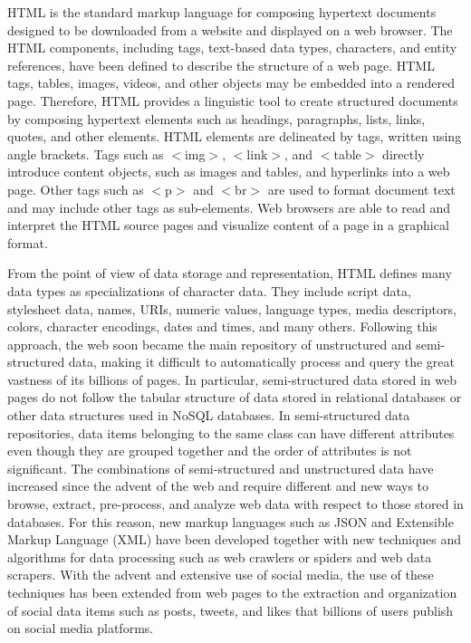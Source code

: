 HTML is the standard markup language for composing hypertext documents designed to be downloaded from a website and displayed on a web browser. The HTML components, including tags, text-based data types, characters, and entity references, have been defined to describe the structure of a web page. HTML tags, tables, images, videos, and other objects may be embedded into a rendered page. Therefore, HTML provides a linguistic tool to create structured documents by composing hypertext elements such as headings, paragraphs, lists, links, quotes, and other elements. HTML elements are delineated by tags, written using angle brackets. Tags such as $<$img$>$, $<$link$>$, and $<$table$>$ directly introduce content objects, such as images and tables, and hyperlinks into a web page. Other tags such as $<$p$>$ and $<$br$>$ are used to format document text and may include other tags as sub-elements. Web browsers are able to read and interpret the HTML source pages and visualize content of a page in a graphical format.

From the point of view of data storage and representation, HTML defines many data types as specializations of character data. They include script data, stylesheet data, names, URIs, numeric values, language types, media descriptors, colors, character encodings, dates and times, and many others. Following this approach, the web soon became the main repository of unstructured and semi-structured data, making it difficult to automatically process and query the great vastness of its billions of pages. In particular, semi-structured data stored in web pages do not follow the tabular structure of data stored in relational databases or other data structures used in NoSQL databases. In semi-structured data repositories, data items belonging to the same class can have different attributes even though they are grouped together and the order of attributes is not significant. The combinations of semi-structured and unstructured data have increased since the advent of the web and require different and new ways to browse, extract, pre-process, and analyze web data with respect to those stored in databases. For this reason, new markup languages such as JSON and Extensible Markup Language (XML) have been developed together with new techniques and algorithms for data processing such as web crawlers or spiders and web data scrapers. With the advent and extensive use of social media, the use of these techniques has been extended from web pages to the extraction and organization of social data items such as posts, tweets, and likes that billions of users publish on social media platforms.


